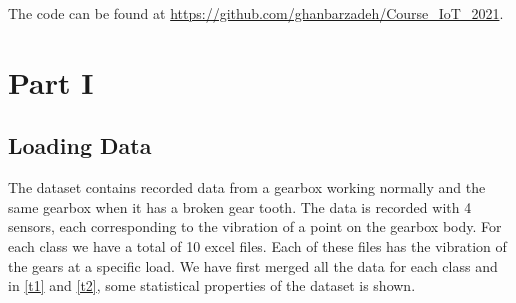 \date{23 Jan, 2022} %







\maketitle 
The code can be found at \url{https://github.com/ghanbarzadeh/Course_IoT_2021}.
\section*{Part I}

\subsection*{Loading Data}

The dataset contains recorded data from a gearbox working normally and the same gearbox when it has a broken gear tooth. The data is recorded with 4 sensors, each corresponding to the vibration of a point on the gearbox body.
For each class we have a total of 10 excel files. Each of these files has the vibration of the gears at a specific load. We have first merged all the data for each class and in \ref{t1} and \ref{t2}, some statistical properties of the dataset is shown.

